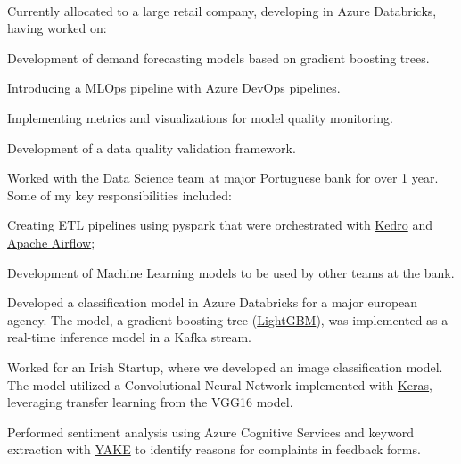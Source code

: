 \documentclass[a4paper]{MagicalCV}
\begin{document}
\begin{minipage}[t]{0.66\textwidth}
 \\
\vspace{\topsep} %
\begin{tightemize}
    \item Currently allocated to a large retail company, developing in Azure Databricks, having worked on:
    \begin{tightemize}
        \item Development of demand forecasting models based on gradient boosting trees.
        \item Introducing a MLOps pipeline with Azure DevOps pipelines.
        \item Implementing metrics and visualizations for model quality monitoring.
        \item Development of a data quality validation framework.
    \end{tightemize}
    \item Worked with the Data Science team at major Portuguese bank for over 1 year. Some of my key responsibilities included:
    \begin{tightemize}
        \item Creating ETL pipelines using pyspark that were orchestrated with \href{https://kedro.readthedocs.io/en/stable/index.html}{Kedro} and \href{https://airflow.apache.org}{Apache Airflow};
        \item Development of Machine Learning models to be used by other teams at the bank.
    \end{tightemize}
    \item Developed a classification model in Azure Databricks for a major european agency. The model, a gradient boosting tree (\href{https://lightgbm.readthedocs.io/en/latest/}{LightGBM}), was implemented as a real-time inference model in a Kafka stream.
    \item Worked for an Irish Startup, where we developed an image classification model. The model utilized a Convolutional Neural Network implemented with \href{https://keras.io/}{Keras}, leveraging transfer learning from the VGG16 model.
    \item Performed sentiment analysis using Azure Cognitive Services and keyword extraction with \href{http://yake.inesctec.pt/}{YAKE} to identify reasons for complaints in feedback forms.
\end{tightemize}
\vspace{0.5ex}
\sectionsep

\end{minipage} 

\printbibliography
\end{document}
